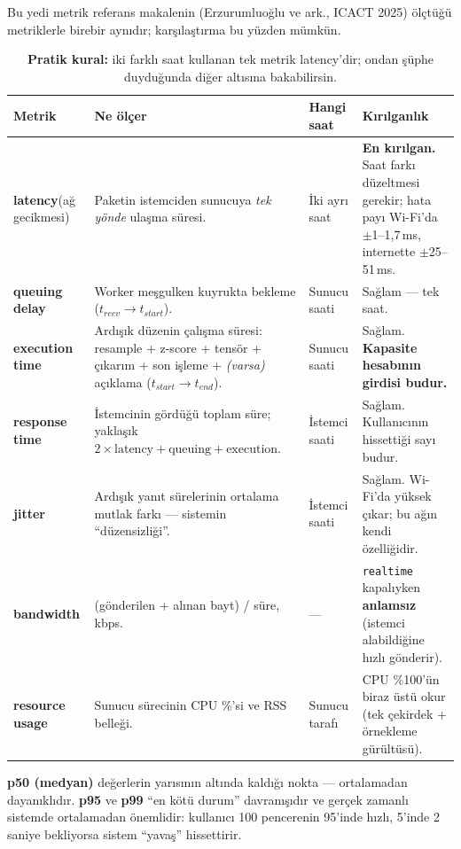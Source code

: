 \documentclass[11pt,a4paper]{article}
\newcommand{\ms}{\,ms}
\newcommand{\kod}[1]{\texttt{\small #1}}
\begin{document}
Bu yedi metrik referans makalenin (Erzurumluoğlu ve ark., ICACT 2025) ölçtüğü
metriklerle birebir aynıdır; karşılaştırma bu yüzden mümkün.

\begin{table}[H]
\centering\footnotesize
\begin{tabular}{@{}p{2.2cm}p{6.2cm}p{2.0cm}p{4.3cm}@{}}
\toprule
\textbf{Metrik} & \textbf{Ne ölçer} & \textbf{Hangi saat} & \textbf{Kırılganlık} \\
\midrule
\textbf{latency}\newline (ağ gecikmesi) &
Paketin istemciden sunucuya \emph{tek yönde} ulaşma süresi. &
İki ayrı saat &
\textbf{En kırılgan.} Saat farkı düzeltmesi gerekir; hata payı Wi-Fi'da
$\pm$1--1{,}7\ms, internette $\pm$25--51\ms. \\
\addlinespace
\textbf{queuing delay} &
Worker meşgulken kuyrukta bekleme ($t_{recv}\to t_{start}$). &
Sunucu saati & Sağlam --- tek saat. \\
\addlinespace
\textbf{execution time} &
Ardışık düzenin çalışma süresi: resample + z-score + tensör + çıkarım +
son işleme + \emph{(varsa)} açıklama ($t_{start}\to t_{end}$). &
Sunucu saati & Sağlam. \textbf{Kapasite hesabının girdisi budur.} \\
\addlinespace
\textbf{response time} &
İstemcinin gördüğü toplam süre; yaklaşık
$2\times\text{latency}+\text{queuing}+\text{execution}$. &
İstemci saati & Sağlam. Kullanıcının hissettiği sayı budur. \\
\addlinespace
\textbf{jitter} &
Ardışık yanıt sürelerinin ortalama mutlak farkı --- sistemin ``düzensizliği''. &
İstemci saati & Sağlam. Wi-Fi'da yüksek çıkar; bu ağın kendi özelliğidir. \\
\addlinespace
\textbf{bandwidth} &
(gönderilen + alınan bayt) / süre, kbps. & --- &
\kod{realtime} kapalıyken \textbf{anlamsız} (istemci alabildiğine hızlı gönderir). \\
\addlinespace
\textbf{resource usage} &
Sunucu sürecinin CPU \%'si ve RSS belleği. & Sunucu tarafı &
CPU \%100'ün biraz üstü okur (tek çekirdek + örnekleme gürültüsü). \\
\bottomrule
\end{tabular}
\caption{\textbf{Pratik kural:} iki farklı saat kullanan tek metrik
latency'dir; ondan şüphe duyduğunda diğer altısına bakabilirsin.}
\end{table}

\begin{tanim}[Yüzdelikler: p50 / p95 / p99]
\textbf{p50 (medyan)} değerlerin yarısının altında kaldığı nokta ---
ortalamadan dayanıklıdır. \textbf{p95} ve \textbf{p99} ``en kötü durum''
davranışıdır ve gerçek zamanlı sistemde ortalamadan önemlidir: kullanıcı 100
pencerenin 95'inde hızlı, 5'inde 2 saniye bekliyorsa sistem ``yavaş''
hissettirir.
\end{tanim}
\end{document}
